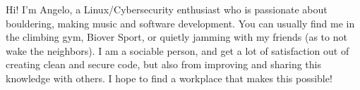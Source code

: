 

\begin{cvparagraph}
	Hi! I'm Angelo, a Linux/Cybersecurity enthusiast who is passionate about bouldering, making music and software development. You can usually find me in the climbing gym, Biover Sport, or quietly jamming with my friends (as to not wake the neighbors). I am a sociable person, and get a lot of satisfaction out of creating clean and secure code, but also from improving and sharing this knowledge with others. I hope to find a workplace that makes this possible!
\end{cvparagraph}


